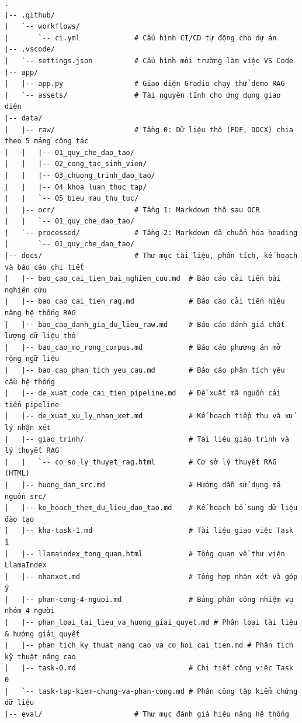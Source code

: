 \begin{lstlisting}[caption={Cấu trúc thư mục dự án.}, label={lst:cau-truc-thu-muc}]
.
|-- .github/
|   `-- workflows/
|       `-- ci.yml             # Cấu hình CI/CD tự động cho dự án
|-- .vscode/
|   `-- settings.json          # Cấu hình môi trường làm việc VS Code
|-- app/
|   |-- app.py                 # Giao diện Gradio chạy thử demo RAG
|   `-- assets/                # Tài nguyên tĩnh cho ứng dụng giao diện
|-- data/
|   |-- raw/                   # Tầng 0: Dữ liệu thô (PDF, DOCX) chia theo 5 mảng công tác
|   |   |-- 01_quy_che_dao_tao/
|   |   |-- 02_cong_tac_sinh_vien/
|   |   |-- 03_chuong_trinh_dao_tao/
|   |   |-- 04_khoa_luan_thuc_tap/
|   |   `-- 05_bieu_mau_thu_tuc/
|   |-- ocr/                   # Tầng 1: Markdown thô sau OCR
|   |   `-- 01_quy_che_dao_tao/
|   `-- processed/             # Tầng 2: Markdown đã chuẩn hóa heading
|       `-- 01_quy_che_dao_tao/
|-- docs/                      # Thư mục tài liệu, phân tích, kế hoạch và báo cáo chi tiết
|   |-- bao_cao_cai_tien_bai_nghien_cuu.md  # Báo cáo cải tiến bài nghiên cứu
|   |-- bao_cao_cai_tien_rag.md             # Báo cáo cải tiến hiệu năng hệ thống RAG
|   |-- bao_cao_danh_gia_du_lieu_raw.md     # Báo cáo đánh giá chất lượng dữ liệu thô
|   |-- bao_cao_mo_rong_corpus.md           # Báo cáo phương án mở rộng ngữ liệu
|   |-- bao_cao_phan_tich_yeu_cau.md        # Báo cáo phân tích yêu cầu hệ thống
|   |-- de_xuat_code_cai_tien_pipeline.md   # Đề xuất mã nguồn cải tiến pipeline
|   |-- de_xuat_xu_ly_nhan_xet.md           # Kế hoạch tiếp thu và xử lý nhận xét
|   |-- giao_trinh/                         # Tài liệu giáo trình và lý thuyết RAG
|   |   `-- co_so_ly_thuyet_rag.html        # Cơ sở lý thuyết RAG (HTML)
|   |-- huong_dan_src.md                    # Hướng dẫn sử dụng mã nguồn src/
|   |-- ke_hoach_them_du_lieu_dao_tao.md    # Kế hoạch bổ sung dữ liệu đào tạo
|   |-- kha-task-1.md                       # Tài liệu giao việc Task 1
|   |-- llamaindex_tong_quan.html           # Tổng quan về thư viện LlamaIndex
|   |-- nhanxet.md                          # Tổng hợp nhận xét và góp ý
|   |-- phan-cong-4-nguoi.md                # Bảng phân công nhiệm vụ nhóm 4 người
|   |-- phan_loai_tai_lieu_va_huong_giai_quyet.md # Phân loại tài liệu & hướng giải quyết
|   |-- phan_tich_ky_thuat_nang_cao_va_co_hoi_cai_tien.md # Phân tích kỹ thuật nâng cao
|   |-- task-0.md                           # Chi tiết công việc Task 0
|   `-- task-tap-kiem-chung-va-phan-cong.md # Phân công tập kiểm chứng dữ liệu
|-- eval/                      # Thư mục đánh giá hiệu năng hệ thống

\end{lstlisting}
